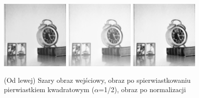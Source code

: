 \documentclass[final,a4paper,openany,12pt]{mwbk}
\begin{document}
\begin{figure}[H]
	\begin{center}
		\includegraphics[width=0.3\textwidth]{1/1Gray_Sqrt_Original}
		\includegraphics[width=0.3\textwidth]{1/1Gray_Sqrt_Result}
		\includegraphics[width=0.3\textwidth]{1/1Gray_Sqrt_Result_Norm}
	\end{center}
	\caption{(Od lewej) Szary obraz wejściowy, obraz po spierwiastkowaniu pierwiastkiem kwadratowym ($\alpha$=1/2), obraz po normalizacji }
\end{figure}
\end{document}
